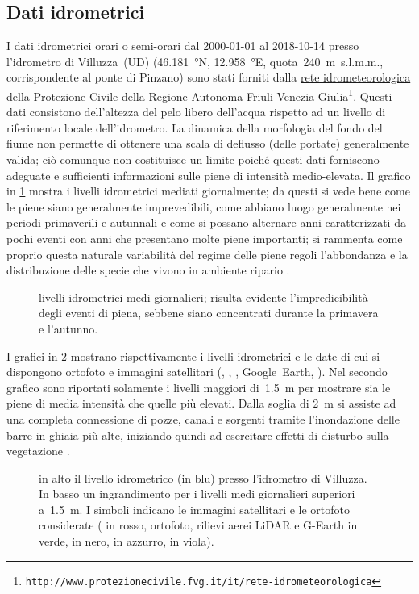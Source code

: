 \subsection{Dati idrometrici}
I dati idrometrici orari o semi-orari dal 2000-01-01 al 2018-10-14 presso l'idrometro di Villuzza~(UD) (\SI{46.181}{\degree}N, \SI{12.958}{\degree}E, quota~\SI{240}{\m}~s.l.m.m., corrispondente al ponte di Pinzano) sono stati forniti dalla \href{http://www.protezionecivile.fvg.it/it/rete-idrometeorologica}{rete idrometeorologica della Protezione Civile della Regione Autonoma Friuli Venezia Giulia}\footnote{\texttt{http://www.protezionecivile.fvg.it/it/rete-idrometeorologica}}.
Questi dati consistono dell'altezza del pelo libero dell'acqua rispetto ad un livello di riferimento locale dell'idrometro.
La dinamica della morfologia del fondo del fiume non permette di ottenere una scala di deflusso (delle portate) generalmente valida; ciò comunque non costituisce un limite poiché questi dati forniscono adeguate e sufficienti informazioni sulle piene di intensità medio-elevata.
Il grafico in \cref{graph:livelli-matrix} mostra i livelli idrometrici mediati giornalmente; da questi si vede bene come le piene siano generalmente imprevedibili, come abbiano luogo generalmente nei periodi primaverili e autunnali e come si possano alternare anni caratterizzati da pochi eventi con anni che presentano molte piene importanti; si rammenta come proprio questa naturale variabilità del regime delle piene regoli l'abbondanza e la distribuzione delle specie che vivono in ambiente ripario .
%
\begin{figure}
	\centering
	
	\caption[livelli idrometrici medi giornalieri]{livelli idrometrici medi giornalieri; risulta evidente l'impredicibilità degli eventi di piena, sebbene siano concentrati durante la primavera e l'autunno.}
	\label{graph:livelli-matrix}
\end{figure}

I grafici in \cref{graph:livelli-orto-sat} mostrano rispettivamente i livelli idrometrici e le date di cui si dispongono ortofoto e immagini satellitari (\AST{}, \Pl{}, \Se{}, Google~Earth, \WV{}). 
Nel secondo grafico sono riportati solamente i livelli maggiori di~\SI{1.5}{\m} per mostrare sia le piene di media intensità che quelle più elevati.
Dalla soglia di \SI{2}{\m} si assiste ad una completa connessione di pozze, canali e sorgenti tramite l'inondazione delle barre in ghiaia più alte, iniziando quindi ad esercitare effetti di disturbo sulla vegetazione .
%
\begin{figure}
	\centering
	
	
	\caption[livelli idrometrici e foto aeree - satellitari]{in alto il livello idrometrico (in blu) presso l'idrometro di Villuzza. 
	In basso un ingrandimento per i livelli medi giornalieri superiori a~\SI{1.5}{\m}. I simboli indicano le immagini satellitari e le ortofoto considerate (\AST{} in rosso, ortofoto, rilievi aerei LiDAR e G-Earth in verde, \Pl{} in nero, \Se{} in azzurro, \WV{} in viola).}
	\label{graph:livelli-orto-sat}
\end{figure}




